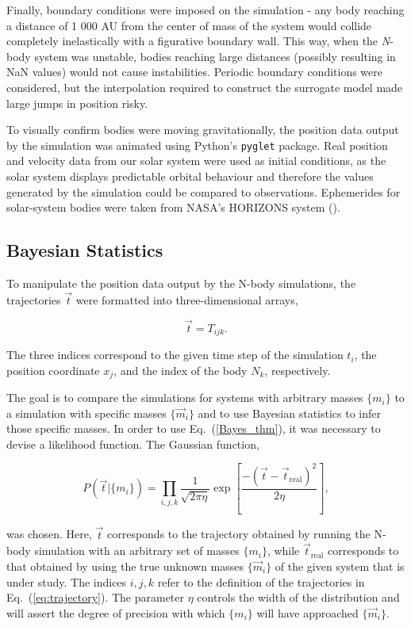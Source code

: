 \documentclass[twocolumn]{aastex63}
\begin{document}
Finally, boundary conditions were imposed on the simulation - any body reaching a distance of 1 000 AU from the center of mass of the system would collide completely inelastically with a figurative boundary wall. This way, when the \textit{N}-body system was unstable, bodies reaching large distances (possibly resulting in NaN values) would not cause instabilities. Periodic boundary conditions were considered, but the interpolation required to construct the surrogate model made large jumps in position risky.

To visually confirm bodies were moving gravitationally, the position data output by the simulation was animated using Python's {\tt\string pyglet} package. Real position and velocity data from our solar system were used as initial conditions, as the solar system displays predictable orbital behaviour and therefore the values generated by the simulation could be compared to observations. Ephemerides for solar-system bodies were taken from NASA's HORIZONS system (\cite{HORIZONS}). 

\subsection{Bayesian Statistics} \label{ssec:statistics} %

To manipulate the position data output by the N-body simulations, the trajectories $\vec{t}$ were formatted into three-dimensional arrays,

\begin{equation} \label{eq:trajectory}
\vec{t} = T_{ijk}.
\end{equation}

\noindent The three indices correspond to the given time step of the simulation $t_i$, the position coordinate $x_j$, and the index of the body $N_k$, respectively. 

The goal is to compare the simulations for systems with arbitrary masses $\{m_i\}$ to a simulation with specific masses $\{\vec{m}_i\}$ and to use Bayesian statistics to infer those specific masses. In order to use Eq.~(\ref{Bayes_thm}), it was necessary to devise a likelihood function. The Gaussian function, 

\begin{equation} \label{eq:likelihood}
P( \vec{t}  | \{m_i\}) = \prod_{i,j,k} \frac{1}{\sqrt{2 \pi \eta}} \exp{\left[ \frac{-(\vec{t} - \vec{t}_{\text{real}})^2}{2\eta} \right]},
\end{equation}

\noindent was chosen. Here, $\vec{t}$ corresponds to the trajectory obtained by running the N-body simulation with an arbitrary set of masses $\{m_i\}$, while $\vec{t}_{\text{real}}$ corresponds to that obtained by using the true unknown masses $\{\vec{m}_i\}$ of the given system that is under study. The indices $i, j, k$ refer to the definition of the trajectories in Eq.~(\ref{eq:trajectory}). The parameter $\eta$ controls the width of the distribution and will assert the degree of precision with which $\{m_i\}$ will have approached $\{\vec{m}_i\}$.
\end{document}
